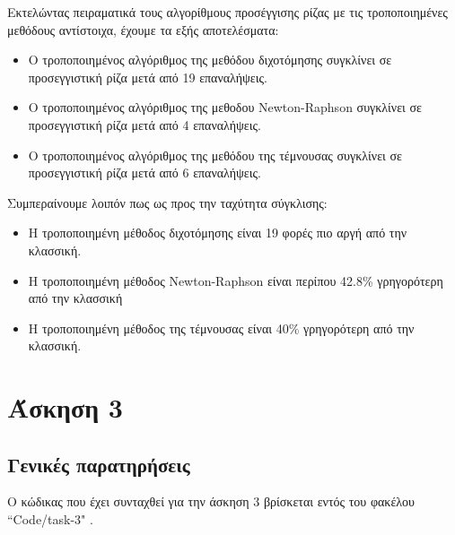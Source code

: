 \documentclass[a4paper,11pt]{article}
\newcommand{\lt}{\latintext}
\begin{document}
Εκτελώντας πειραματικά τους αλγορίθμους προσέγγισης ρίζας με τις τροποποιημένες μεθόδους αντίστοιχα, έχουμε τα εξής αποτελέσματα:
\begin{itemize}
\item Ο τροποποιημένος αλγόριθμος της μεθόδου διχοτόμησης συγκλίνει σε προσεγγιστική ρίζα μετά από 19 επαναλήψεις.
\item Ο τροποποιημένος αλγόριθμος της μεθοδου {\lt Newton-Raphson} συγκλίνει σε προσεγγιστική ρίζα μετά από 4 επαναλήψεις.
\item Ο τροποποιημένος αλγόριθμος της μεθόδου της τέμνουσας συγκλίνει σε προσεγγιστική ρίζα μετά από 6 επαναλήψεις.
\end{itemize}

Συμπεραίνουμε λοιπόν πως ως προς την ταχύτητα σύγκλισης:
\begin{itemize}
\item Η τροποποιημένη μέθοδος διχοτόμησης είναι 19 φορές πιο αργή από την κλασσική.
\item Η τροποποιημένη μέθοδος {\lt Newton-Raphson} είναι περίπου 42.8\% γρηγορότερη από την κλασσική
\item Η τροποποιημένη μέθοδος της τέμνουσας είναι 40\% γρηγορότερη από την κλασσική.
\end{itemize}

\section*{Άσκηση 3}
\subsection*{Γενικές παρατηρήσεις}
Ο κώδικας που έχει συνταχθεί για την άσκηση 3 βρίσκεται εντός του φακέλου {\lt ``Code/task-3" }.\\
\end{document}
